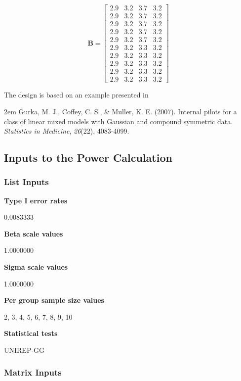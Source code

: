 \documentclass{glimmpse-report}
\begin{document}
\[
\mathbf{B}=\begin{bmatrix}
2.9 & 3.2 & 3.7 & 3.2\\
2.9 & 3.2 & 3.7 & 3.2\\
2.9 & 3.2 & 3.7 & 3.2\\
2.9 & 3.2 & 3.7 & 3.2\\
2.9 & 3.2 & 3.7 & 3.2\\
2.9 & 3.2 & 3.3 & 3.2\\
2.9 & 3.2 & 3.3 & 3.2\\
2.9 & 3.2 & 3.3 & 3.2\\
2.9 & 3.2 & 3.3 & 3.2\\
2.9 & 3.2 & 3.3 & 3.2
\end{bmatrix}\]

The design is based on an example presented in

 \hangindent2em
Gurka, M. J., Coffey, C. S., \& Muller, K. E. (2007). Internal pilots for a class of linear mixed models with Gaussian and compound symmetric data. \emph{Statistics in Medicine}, \emph{26}(22), 4083-4099.


\subsection{Inputs to the Power Calculation}
\subsubsection{List Inputs}

{\bf Type I error rates}

0.0083333

{\bf Beta scale values}

1.0000000

{\bf Sigma scale values}

1.0000000

{\bf Per group sample size values}

2, 3, 4, 5, 6, 7, 8, 9, 10

{\bf Statistical tests}

UNIREP-GG

\subsubsection{Matrix Inputs}
\end{document}
